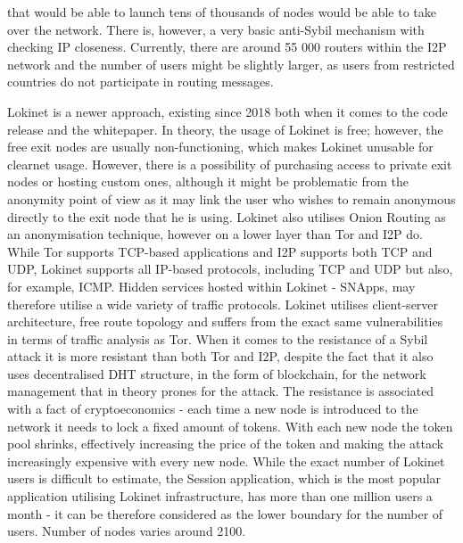 that would be able to launch tens of thousands of nodes would be able to take over the network. There is, however, a very basic anti-Sybil mechanism with checking IP closeness. Currently, there are around 55 000 routers within the I2P network and the number of users might be slightly larger, as users from restricted countries do not participate in routing messages. 

Lokinet is a newer approach, existing since 2018 both when it comes to the code release and the whitepaper. In theory, the usage of Lokinet is free; however, the free exit nodes are usually non-functioning, which makes Lokinet unusable for clearnet usage. However, there is a possibility of purchasing access to private exit nodes or hosting custom ones, although it might be problematic from the anonymity point of view as it may link the user who wishes to remain anonymous directly to the exit node that he is using. Lokinet also utilises Onion Routing as an anonymisation technique, however on a lower layer than Tor and I2P do. While Tor supports TCP-based applications and I2P supports both TCP and UDP, Lokinet supports all IP-based protocols, including TCP and UDP but also, for example, ICMP. Hidden services hosted within Lokinet - SNApps, may therefore utilise a wide variety of traffic protocols. Lokinet utilises client-server architecture, free route topology and suffers from the exact same vulnerabilities in terms of traffic analysis as Tor. When it comes to the resistance of a Sybil attack it is more resistant than both Tor and I2P, despite the fact that it also uses decentralised DHT structure, in the form of blockchain, for the network management that in theory prones for the attack. The resistance is associated with a fact of cryptoeconomics - each time a new node is introduced to the network it needs to lock a fixed amount of tokens. With each new node the token pool shrinks, effectively increasing the price of the token and making the attack increasingly expensive with every new node. While the exact number of Lokinet users is difficult to estimate, the Session application, which is the most popular application utilising Lokinet infrastructure, has more than one million users a month - it can be therefore considered as the lower boundary for the number of users. Number of nodes varies around 2100.

